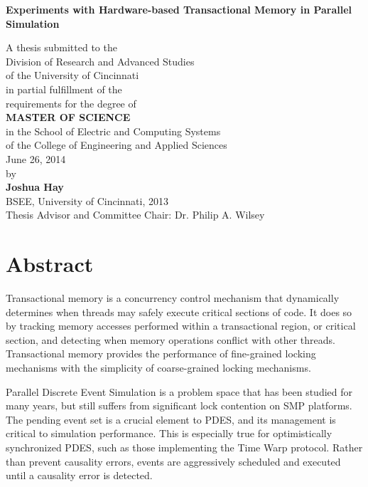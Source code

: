 \documentclass[11pt]{book}
\begin{document}
\thispagestyle{empty}

\doublespacing

\vspace*{0.5in}

\begin{center}
\LARGE{\textbf{Experiments with Hardware-based Transactional Memory in Parallel Simulation}}

\vspace*{0.4in}

  {\large A thesis submitted to the\\[0.20in]
    Division of Research and Advanced Studies\\
    of the University of Cincinnati\\[0.20in]
    in partial fulfillment of the\\
    requirements for the degree of\\[0.20in]
    {\bf MASTER OF SCIENCE}\\[0.20in]
    in the School of Electric and Computing Systems\\
    of the College of Engineering and Applied Sciences\\[0.20in]
    June 26, 2014\\[0.20in]
    by\\[0.20in]
    {\bf Joshua Hay}\\
    BSEE, University of Cincinnati, 2013\\}
  \vspace{0.5in}
  {\large Thesis Advisor and Committee Chair:  Dr. Philip A. Wilsey}
\end{center}

\clearpage

\setcounter{page}{1}
\clearpage

\chapter*{Abstract} 

Transactional memory is a concurrency control mechanism that dynamically determines when
threads may safely execute critical sections of code.  It does so by tracking memory
accesses performed within a transactional region, or critical section, and detecting when
memory operations conflict with other threads.  Transactional memory provides the
performance of fine-grained locking mechanisms with the simplicity of coarse-grained
locking mechanisms.

Parallel Discrete Event Simulation is a problem space that has been studied for many
years, but still suffers from significant lock contention on SMP platforms.  The pending
event set is a crucial element to PDES, and its management is critical to simulation
performance.  This is especially true for optimistically synchronized PDES, such as those
implementing the Time Warp protocol.  Rather than prevent causality errors, events are
aggressively scheduled and executed until a causality error is detected.
\end{document}
